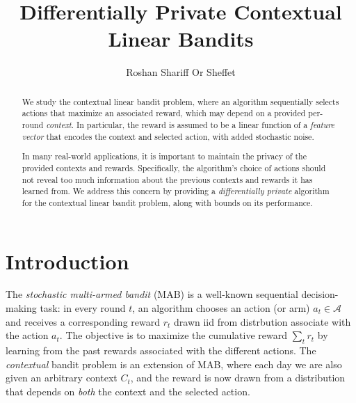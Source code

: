 \documentclass{article}
\title{Differentially Private Contextual Linear Bandits}
\author{
  Roshan Shariff
  \And
  Or Sheffet
}
\newcommand{\A}{\mathcal{A}}
\begin{document}
\maketitle

\begin{abstract}
  We study the contextual linear bandit problem, where an algorithm
  sequentially selects actions that maximize an associated reward,
  which may depend on a provided per-round \emph{context}.  In
  particular, the reward is assumed to be a linear function of a
  \emph{feature vector} that encodes the context and selected action,
  with added stochastic noise.

  In many real-world applications, it is important to maintain the
  privacy of the provided contexts and rewards.  Specifically, the
  algorithm's choice of actions should not reveal too much information
  about the previous contexts and rewards it has learned from.  We
  address this concern by providing a \emph{differentially private}
  algorithm for the contextual linear bandit problem, along with
  bounds on its performance.
\end{abstract}

\section{Introduction}
\label{sec:introduction}

The \emph{stochastic multi-armed bandit} (MAB) is a well-known sequential
decision-making task: in every round $t$, an algorithm chooses an
action (or arm) $a_t\in\A$ and receives a corresponding reward $r_t$ drawn iid from distrbution associate with the action $a_t$.
The objective is to maximize the cumulative reward $\sum_t r_t$ by
learning from the past rewards associated with the different actions.
The \emph{contextual} bandit problem is an extension of MAB, where each day we are also given an arbitrary 
context $C_t$, and the reward is now drawn from a distribution that depends on \emph{both} the context and the selected action.

\end{document}
